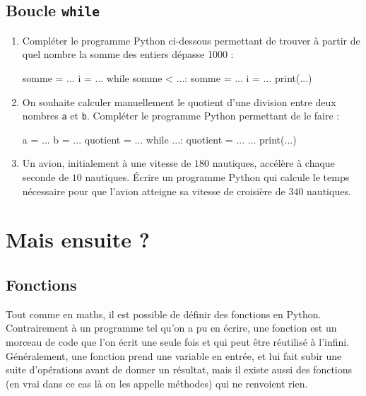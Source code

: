 \documentclass[12pt,a4paper, oneside]{article}
\begin{document}
   \subsection{Boucle \texttt{while}}\label{subsec:boucle-texttt-while}
      \begin{enumerate}
         \item Compléter le programme Python ci-dessous permettant de trouver à partir de quel nombre la somme des entiers dépasse 1000 :
            \begin{pyverbatim}
              somme = ...
              i = ...
              while somme < ...:
                somme = ...
                i = ...
              print(...)
            \end{pyverbatim}
         \item On souhaite calculer manuellement le quotient d'une division entre deux nombres \texttt{a} et \texttt{b}.
         Compléter le programme Python permettant de le faire :
            \begin{pyverbatim}
              a = ...
              b = ...
              quotient = ...
              while ...:
                quotient = ...
                ...
              print(...)
            \end{pyverbatim}
         \item Un avion, initialement à une vitesse de $180$ nautiques, accélère à chaque seconde de $10$ nautiques.
         Écrire un programme Python qui calcule le temps nécessaire pour que l'avion atteigne sa vitesse de croisière de $340$ nautiques.
      \end{enumerate}

\section{Mais ensuite ?}\label{sec:mais-ensuite-?}
   \subsection{Fonctions}\label{subsec:fonctions}
   Tout comme en maths, il est possible de définir des fonctions en Python.
   Contrairement à un programme tel qu'on a pu en écrire, une fonction est un morceau de code que l'on écrit une seule fois et qui peut être réutilisé à l'infini.
   Généralement, une fonction prend une variable en entrée, et lui fait subir une suite d'opérations avant de donner un résultat, mais il existe aussi des fonctions (en vrai dans ce cas là on les appelle méthodes) qui ne renvoient rien.
\end{document}
